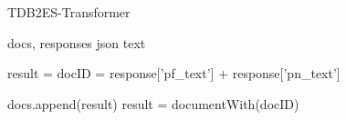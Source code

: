 % 
% 	
% 
% 
% 
% 
% 
% 
% 

\begin{algorithm}[H]
\caption{TDB2ES-Transformer}\label{alg:etl_transformer_tdb2es}
\begin{algorithmic}                   %
\Require docs, responses
\Ensure json text

	\State result = {}	
	\State docID = response['pf\_text'] + response['pn\_text']
	
	\State docs.append(result)	
	\Else
		\State result = documentWith(docID)		
	\EndIf

\end{algorithmic}
\end{algorithm}

